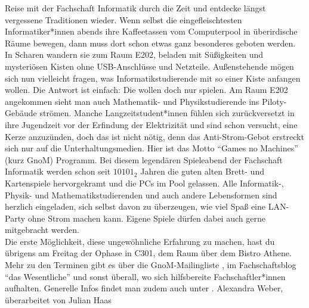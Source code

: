 {Reise mit der Fachschaft Informatik durch die Zeit und entdecke längst vergessene Traditionen wieder.
}{
    Wenn selbst die eingefleischtesten Informatiker*innen abends ihre Kaffeetassen vom Computerpool in überirdische Räume bewegen, dann muss dort schon etwas ganz besonderes geboten werden. In Scharen wandern sie zum Raum E202, beladen mit Süßigkeiten und mysteriösen Kisten ohne USB-Anschlüsse und Netzteile. Außenstehende mögen sich nun vielleicht fragen, was Informatikstudierende mit so einer Kiste anfangen wollen. Die Antwort ist einfach: Die wollen doch nur spielen.
    Am Raum E202 angekommen sieht man auch Mathematik- und Physikstudierende ins Piloty-Gebäude strömen. Manche Langzeitstudent*innen fühlen sich zurückversetzt in ihre Jugendzeit vor der Erfindung der Elektrizität und sind schon versucht, eine Kerze anzuzünden, doch das ist nicht nötig, denn das Anti-Strom-Gebot erstreckt sich nur auf die Unterhaltungsmedien. Hier ist das Motto "`Games no Machines"' (kurz GnoM) Programm.
    Bei diesem legendären Spieleabend der Fachschaft Informatik werden schon seit $10101_2$ Jahren die guten alten Brett- und Kartenspiele hervorgekramt und die PCs im Pool gelassen.
    Alle Informatik-, Physik- und Mathematikstudierenden und auch andere Lebensformen sind herzlich eingeladen, sich selbst davon zu überzeugen, wie viel Spaß eine LAN-Party ohne Strom machen kann. Eigene Spiele dürfen dabei auch gerne mitgebracht werden.\\
    Die erste Möglichkeit, diese ungewöhnliche Erfahrung zu machen, hast du übrigens am Freitag der Ophase in C301, dem Raum über dem Bistro Athene.\\
    Mehr zu den Terminen gibt es über die GnoM-Mailingliste \footnotemark[1], im Fachschaftsblog "`das Wesentliche"' \footnotemark[2] und sonst überall, wo sich hilfsbereite Fachschaftler*innen aufhalten. Generelle Infos findet man zudem auch unter \footnotemark[3].
}
{Alexandra Weber,\\
    überarbeitet von Julian Haas}


\vfill
{}
\newpage
